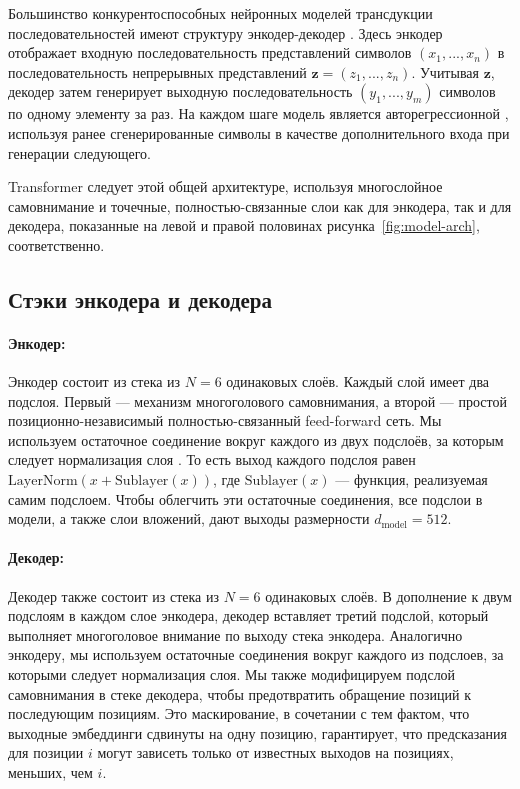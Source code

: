 \documentclass{article}
\newcommand{\dmodel}{d_{\text{model}}}
\begin{document}
Большинство конкурентоспособных нейронных моделей трансдукции последовательностей имеют структуру энкодер-декодер \citep{cho2014learning,bahdanau2014neural,sutskever14}. Здесь энкодер отображает входную последовательность представлений символов $(x_1, ..., x_n)$ в последовательность непрерывных представлений $\mathbf{z} = (z_1, ..., z_n)$. Учитывая $\mathbf{z}$, декодер затем генерирует выходную последовательность $(y_1,...,y_m)$ символов по одному элементу за раз. На каждом шаге модель является авторегрессионной \citep{graves2013generating}, используя ранее сгенерированные символы в качестве дополнительного входа при генерации следующего.

Transformer следует этой общей архитектуре, используя многослойное самовнимание и точечные, полностью-связанные слои как для энкодера, так и для декодера, показанные на левой и правой половинах рисунка~\ref{fig:model-arch}, соответственно.

\subsection{Стэки энкодера и декодера}

\paragraph{Энкодер:}Энкодер состоит из стека из $N=6$ одинаковых слоёв. Каждый слой имеет два подслоя. Первый — механизм многоголового самовнимания, а второй — простой позиционно-независимый полностью-связанный feed-forward сеть. Мы используем остаточное соединение \citep{he2016deep} вокруг каждого из двух подслоёв, за которым следует нормализация слоя \cite{layernorm2016}. То есть выход каждого подслоя равен $\mathrm{LayerNorm}(x + \mathrm{Sublayer}(x))$, где $\mathrm{Sublayer}(x)$ — функция, реализуемая самим подслоем. Чтобы облегчить эти остаточные соединения, все подслои в модели, а также слои вложений, дают выходы размерности $\dmodel=512$.

\paragraph{Декодер:}Декодер также состоит из стека из $N=6$ одинаковых слоёв. В дополнение к двум подслоям в каждом слое энкодера, декодер вставляет третий подслой, который выполняет многоголовое внимание по выходу стека энкодера. Аналогично энкодеру, мы используем остаточные соединения вокруг каждого из подслоев, за которыми следует нормализация слоя. Мы также модифицируем подслой самовнимания в стеке декодера, чтобы предотвратить обращение позиций к последующим позициям. Это маскирование, в сочетании с тем фактом, что выходные эмбеддинги сдвинуты на одну позицию, гарантирует, что предсказания для позиции $i$ могут зависеть только от известных выходов на позициях, меньших, чем $i$.
\end{document}
